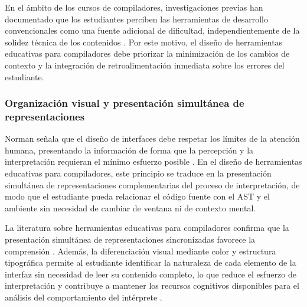 En el ámbito de los cursos de compiladores, investigaciones previas han documentado que los estudiantes perciben las herramientas de desarrollo convencionales como una fuente adicional de dificultad, independientemente de la solidez técnica de los contenidos \cite{zagami2023}. Por este motivo, el diseño de herramientas educativas para compiladores debe priorizar la minimización de los cambios de contexto y la integración de retroalimentación inmediata sobre los errores del estudiante.

\subsubsection{Organización visual y presentación simultánea de representaciones}

Norman señala que el diseño de interfaces debe respetar los límites de la atención humana, presentando la información de forma que la percepción y la interpretación requieran el mínimo esfuerzo posible \cite{norman2013design}. En el diseño de herramientas educativas para compiladores, este principio se traduce en la presentación simultánea de representaciones complementarias del proceso de interpretación, de modo que el estudiante pueda relacionar el código fuente con el AST y el ambiente sin necesidad de cambiar de ventana ni de contexto mental.

La literatura sobre herramientas educativas para compiladores confirma que la presentación simultánea de representaciones sincronizadas favorece la comprensión \cite{Stamenkovic2024AWE, jovanovic2021comvis}. Además, la diferenciación visual mediante color y estructura tipográfica permite al estudiante identificar la naturaleza de cada elemento de la interfaz sin necesidad de leer su contenido completo, lo que reduce el esfuerzo de interpretación y contribuye a mantener los recursos cognitivos disponibles para el análisis del comportamiento del intérprete \cite{Hannebauer2018}.

